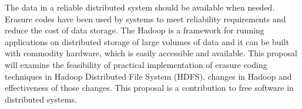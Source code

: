   The data in a reliable distributed system should be available when
  needed. Erasure codes have been used by systems to meet reliability
  requirements and reduce the cost of data storage. The Hadoop is a
  framework for running applications on distributed storage of large
  volumes of data and it can be built with commodity hardware, which
  is easily accessible and available. This proposal will examine the
  feasibility of practical implementation of erasure coding techniques
  in Hadoop Distributed File System (HDFS), changes in Hadoop and
  effectiveness of those changes. This proposal is a contribution to
  free software in distributed systems.
